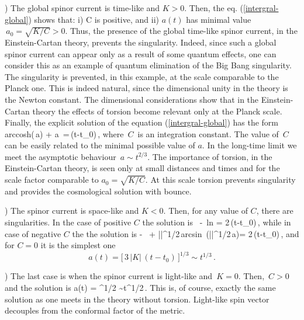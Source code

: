 ) The global spinor current is time-like and $K>0$. 
Then, the eq. (\ref{intergral-global}) shows that: 
i) C is positive, and ii) $a(t)$ has
minimal value $\,a_0=\sqrt{K/C} > 0$. Thus, the presence of the 
global time-like
spinor current, in the Einstein-Cartan theory, prevents the
singularity. Indeed, since such a global spinor current can
appear only as a result of some quantum effects, one can consider
this as an example of quantum elimination of the Big Bang
singularity. The singularity is prevented, in this example, at
the scale comparable to the Planck one. This is indeed natural,
since the dimensional unity in the theory is the Newton constant. 
The dimensional considerations \cite{hehl} show that in the
Einstein-Cartan theory the effects of torsion become relevant
only at the Planck scale. Finally, the explicit solution of the 
equation (\ref{intergral-global}) has the form
\beq
arccosh\left(\,a\right)
+ a\,
=\,(t-t_0)\,,
\label{otvet-global}
\eeq
where $\,C\,$ is an integration constant. The value of $\,C\,$ 
can be easily related to the minimal possible value of $a$. 
In the long-time limit we meet the asymptotic behaviour 
$\,a \sim t^{2/3}$. The importance of torsion,
in the Einstein-Cartan theory, is seen only at small 
distances and times and for the scale factor comparable to 
$a_0=\sqrt{K/C}$. At this scale torsion prevents singularity
and provides the cosmological solution with bounce.
\vskip 2mm

) The spinor current is space-like and $K<0$. 
Then, for any value of $C$, there are singularities. 
In the case of positive $C$ the solution is
\beq
{}\,
- \,{\rm ln}
= 2\,(t-t_0)\,,
\label{otvet-global2}
\eeq
while in case of negative $C$ the the solution is
\beq
- \,
+ \left|\right|^{1/2}\,{\rm arcsin}\,
\left(\left|\right|^{1/2}\,a\right)= 2\,(t-t_0)\,,
\label{otvet-global3}
\eeq
and for $C=0$ it is the simplest one 
$$
a(t) = \Big[\,3\,|K|\,(t-t_0)\,\Big]^{1/3} \sim t^{1/3}\,.
$$
\vskip 2mm

) The last case is when the spinor current is light-like and 
$\,K=0$. Then, $\,C>0\,$ and the solution is 
\beq
a(t) = ^{1/2} \sim t^{1/2}\,.
\label{K=0}
\eeq
This is, of course, exactly the same solution as one meets 
in the theory without torsion. Light-like spin vector 
decouples from the conformal factor of the metric. 
\vskip 1mm

